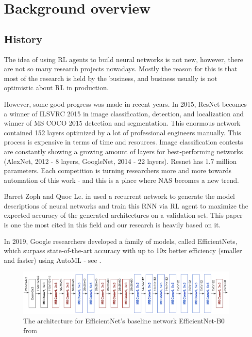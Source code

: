\chapter{Background overview}

\section{History}

The idea of using RL agents to build neural networks is not new, however, there are not so many research projects nowadays. Mostly the reason for this is that most of the research is held by the business, and business usually is not optimistic about RL in production.

However, some good progress was made in recent years. In 2015, ResNet becomes a winner of ILSVRC 2015 in image classification, detection, and localization and winner of MS COCO 2015 detection and segmentation. This enormous network contained 152 layers optimized by a lot of professional engineers manually. This process is expensive in terms of time and resources. Image classification contests are constantly showing a growing amount of layers for best-performing networks (AlexNet, 2012 - 8 layers, GoogleNet, 2014 - 22 layers). Resnet has 1.7 million parameters. Each competition is turning researchers more and more towards automation of this work - and this is a place where NAS becomes a new trend.

Barret Zoph and Quoc Le. in \cite{ZophL16} used a recurrent network to generate the model descriptions of neural networks and train this RNN via RL agent to maximize the expected accuracy of the generated architectures on a validation set. This paper is one the most cited in this field and our research is heavily based on it.

In 2019, Google researchers developed a family of models, called EfficientNets, which surpass state-of-the-art accuracy with up to 10x better efficiency (smaller and faster) using AutoML - see \cite{2019arXiv190511946T}.

\begin{figure}[]
  \includegraphics[width=\linewidth]{images/efficientnet.png}
  \caption{The architecture for EfficientNet's baseline network EfficientNet-B0 from \cite{2019arXiv190511946T}}
  \label{fig:efficientnet}
\end{figure}

